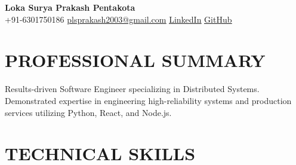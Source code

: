 \documentclass[a4paper,10pt]{article}
\begin{document}
\pagestyle{empty}
\thispagestyle{empty}

\begin{center}
  {\LARGE \textbf{Loka Surya Prakash Pentakota}} \\[2pt]
  \small +91-6301750186 \enspace\textbar\enspace \href{mailto:plsprakash2003@gmail.com}{\underline{plsprakash2003@gmail.com}} \enspace\textbar\enspace \href{https://linkedin.com/in/applicant}{\underline{LinkedIn}} \enspace\textbar\enspace \href{https://github.com/applicant}{\underline{GitHub}}
\end{center}
\vspace{-8pt}

\section{PROFESSIONAL SUMMARY}
{\small Results-driven Software Engineer specializing in Distributed Systems. Demonstrated expertise in engineering high-reliability systems and production services utilizing Python, React, and Node.js.\par}
\section{TECHNICAL SKILLS}
\\[0.5pt]
\\[0.5pt]
\\[0.5pt]
\\[0.5pt]
\\[0.5pt]
\\[0.5pt]
\end{document}
